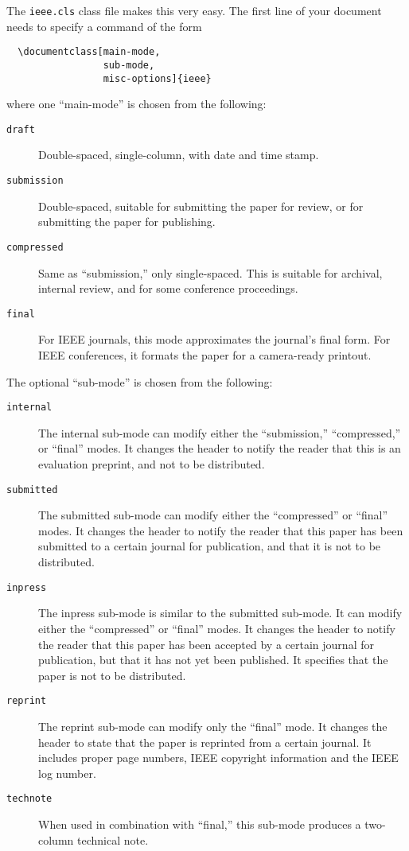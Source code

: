 \documentclass[%
	final,
	notitlepage,
	narroweqnarray,
	inline,
	twoside,
	]{ieee}
\begin{document}
The \texttt{ieee.cls} class file makes this very easy.  The first line
of your document needs to specify a command of the form
\begin{verbatim}
  \documentclass[main-mode,
                 sub-mode,
                 misc-options]{ieee}
\end{verbatim}
where one ``main-mode'' is chosen from the following:
\begin{description}
\item[\texttt{draft}] Double-spaced, single-column, with date and time
     stamp.
\item[\texttt{submission}] Double-spaced, suitable for submitting the
     paper for review, or for submitting the paper for publishing.
\item[\texttt{compressed}] Same as ``submission,'' only single-spaced.
     This is suitable for archival, internal review, and for some 
     conference proceedings. 
\item[\texttt{final}] For IEEE journals, this mode approximates the
     journal's final form. For IEEE conferences, it formats
     the paper for a camera-ready printout.
\end{description}
The optional ``sub-mode'' is chosen from the following:
\begin{description}
\item[\texttt{internal}] The internal sub-mode can modify either the
    ``submission,'' 
    ``compressed,'' or ``final'' modes. It changes the header to notify 
    the reader that this is an evaluation preprint, and not to be
    distributed. 
\item[\texttt{submitted}] The submitted sub-mode can modify either the
    ``compressed'' or ``final'' modes. It changes the header to notify 
    the reader that this paper has been submitted to a certain journal 
    for publication, and that it is not to be distributed.
\item[\texttt{inpress}] The inpress sub-mode is similar to the submitted 
    sub-mode. It can modify either the ``compressed'' or ``final'' modes. 
    It changes the header to notify the 
    reader that this paper has been accepted by a certain journal for 
    publication, but that it has not yet been published. It specifies that 
    the paper is not to be distributed.
\item[\texttt{reprint}] The reprint sub-mode can modify only the ``final''
    mode. It changes the header to state that the paper is reprinted
    from a certain journal. It includes proper page numbers, IEEE
    copyright information and the IEEE log number.
\item[\texttt{technote}] When used in combination with ``final,''
    this sub-mode produces a two-column technical note.
\end{description}
\end{document}
